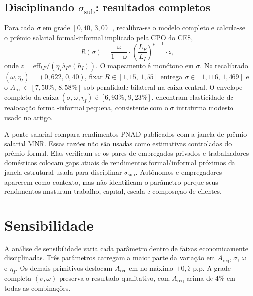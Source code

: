 \documentclass[12pt,a4paper]{article}
\begin{document}
\subsection{Disciplinando $\sigma_{\text{sub}}$: resultados completos}

Para cada $\sigma$ em grade $[0{,}40,\,3{,}00]$, recalibra-se o modelo completo e calcula-se o pr\^emio salarial formal-informal implicado pela CPO do CES,
\[
R(\sigma)=\frac{\omega}{1-\omega}\cdot\left(\frac{L_F}{L_I}\right)^{\rho-1}\cdot z,
\]
onde $z=\text{eff}_{hF}/(\eta_I h_I e(h_I))$. O mapeamento \'e mon\'otono em $\sigma$. No recalibrado $(\omega,\eta_I)=(0{,}622,\,0{,}40)$, fixar $R\in[1{,}15,\,1{,}55]$ entrega $\sigma\in[1{,}116,\,1{,}469]$ e o $A_{\text{req}}\in[7{,}50\%,\,8{,}58\%]$ sob penalidade bilateral na caixa central. O envelope completo da caixa $(\sigma,\omega,\eta_I)$ \'e $[6{,}93\%,\,9{,}23\%]$. \citet{DerenoncourtGerardLagosMontialoux2025} encontram elasticidade de realoca\c{c}\~ao formal-informal pequena, consistente com o $\sigma$ intrafirma modesto usado no artigo.

A ponte salarial compara rendimentos PNAD publicados com a janela de pr\^emio salarial MNR. Essas raz\~oes n\~ao s\~ao usadas como estimativas controladas do pr\^emio formal. Elas verificam se os pares de empregados privados e trabalhadores dom\'esticos colocam gaps atuais de rendimentos formal/informal pr\'oximos da janela estrutural usada para disciplinar $\sigma_{\text{sub}}$. Aut\^onomos e empregadores aparecem como contexto, mas n\~ao identificam o par\^ametro porque seus rendimentos misturam trabalho, capital, escala e composi\c{c}\~ao de clientes.



\clearpage
\section{Sensibilidade}\label{app:sensitivity}

A an\'alise de sensibilidade varia cada par\^ametro dentro de faixas economicamente disciplinadas. Tr\^es par\^ametros carregam a maior parte da varia\c{c}\~ao em $A_{\text{req}}$, $\sigma$, $\omega$ e $\eta_I$. Os demais primitivos deslocam $A_{\text{req}}$ em no m\'aximo $\pm 0{,}3$ p.p. A grade completa $(\sigma,\omega)$ preserva o resultado qualitativo, com $A_{\text{req}}$ acima de $4\%$ em todas as combina\c{c}\~oes.
\end{document}
